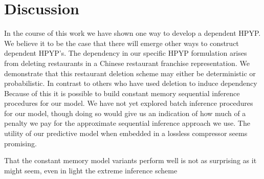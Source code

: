\section{Discussion}
\label{discussion}

In the course of this work we have shown one way to develop a dependent HPYP.  We believe it to be the case that there will emerge other ways to construct dependent HPYP's.  The dependency in our specific HPYP formulation arises from deleting restaurants in a Chinese restaurant franchise representation.  We demonstrate that this restaurant deletion scheme may either be deterministic or probabilistic.  In contrast to others who have used deletion to induce dependency Because of this it is possible to build constant memory sequential inference procedures for our model.  We have not yet explored batch inference procedures for our model, though doing so would give us an indication of how much of a penalty we pay for the approximate sequential inference approach we use.  The utility of our predictive model when embedded in a lossless compressor seems promising.

That the constant memory model variants perform well is not as surprising as it might seem, even in light the extreme inference scheme

